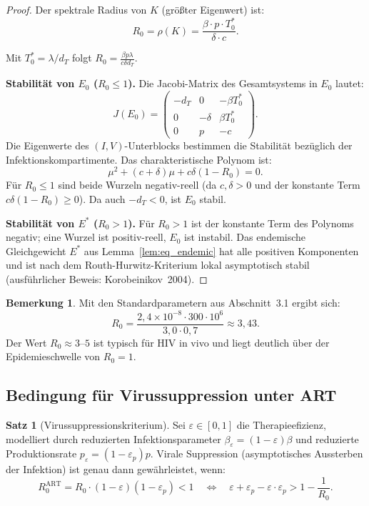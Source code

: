 ﻿\documentclass[a4paper,12pt]{article}
\theoremstyle{definition}
\newtheorem{satz}{Satz}
\newtheorem{bemerkung}{Bemerkung}
\begin{document}
\begin{proof}
Der spektrale Radius von $K$ (gr\"o\ss ter Eigenwert) ist:
\[
R_0 = \rho(K) = \frac{\beta \cdot p \cdot T_0^*}{\delta \cdot c}.
\]

Mit $T_0^* = \lambda / d_T$ folgt $R_0 = \frac{\beta p \lambda}{c \delta d_T}$.

\textbf{Stabilit\"at von $E_0$ ($R_0 \leq 1$).}
Die Jacobi-Matrix des Gesamtsystems in $E_0$ lautet:
\[
J(E_0) = \begin{pmatrix}
-d_T & 0 & -\beta T_0^* \\
0 & -\delta & \beta T_0^* \\
0 & p & -c
\end{pmatrix}.
\]
Die Eigenwerte des $(I, V)$-Unterblocks bestimmen die Stabilit\"at
bez\"uglich der Infektionskompartimente. Das charakteristische Polynom ist:
\[
\mu^2 + (c + \delta) \mu + c\delta (1 - R_0) = 0.
\]
F\"ur $R_0 \leq 1$ sind beide Wurzeln negativ-reell (da $c, \delta > 0$ und der
konstante Term $c\delta(1 - R_0) \geq 0$). Da auch $-d_T < 0$, ist $E_0$ stabil.

\textbf{Stabilit\"at von $E^*$ ($R_0 > 1$).}
F\"ur $R_0 > 1$ ist der konstante Term des Polynoms negativ; eine Wurzel ist
positiv-reell, $E_0$ ist instabil. Das endemische Gleichgewicht $E^*$ aus
Lemma~\ref{lem:eq_endemic} hat alle positiven Komponenten und ist nach dem
Routh-Hurwitz-Kriterium lokal asymptotisch stabil (ausf\"uhrlicher Beweis:
Korobeinikov~2004).
\end{proof}

\begin{bemerkung}
Mit den Standardparametern aus Abschnitt~3.1 ergibt sich:
\[
R_0 = \frac{2{,}4 \times 10^{-8} \cdot 300 \cdot 10^6}{3{,}0 \cdot 0{,}7} \approx 3{,}43.
\]
Der Wert $R_0 \approx 3$--$5$ ist typisch f\"ur HIV in vivo und liegt deutlich \"uber der
Epidemieschwelle von $R_0 = 1$.
\end{bemerkung}

\subsection{Bedingung f\"ur Virussuppression unter ART}

\begin{satz}[Virussuppressionskriterium]
\label{satz:suppression}
Sei $\varepsilon \in [0, 1]$ die Therapieefizienz, modelliert durch reduzierten
Infektionsparameter $\beta_{\varepsilon} = (1 - \varepsilon) \beta$ und
reduzierte Produktionsrate $p_{\varepsilon} = (1 - \varepsilon_p) p$.
Virale Suppression (asymptotisches Aussterben der Infektion) ist genau dann gew\"ahrleistet, wenn:
\[
R_0^{\mathrm{ART}} = R_0 \cdot (1-\varepsilon)(1-\varepsilon_p) < 1
\quad\Leftrightarrow\quad
\varepsilon + \varepsilon_p - \varepsilon \cdot \varepsilon_p > 1 - \frac{1}{R_0}.
\]
\end{satz}
\end{document}
